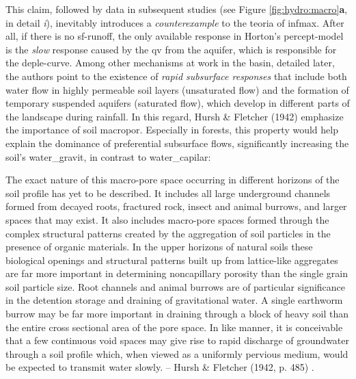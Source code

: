 \documentclass[./main_en.tex]{subfiles}
\begin{document}
\noindent This claim, followed by data in subsequent studies (see Figure \ref{fig:hydro:macro}\textbf{a}, in detail \textit{i}), inevitably introduces a \textit{counterexample} to the \gls{teoria} of \gls{infmax}. After all, if there is no \gls{sf-runoff}, the only available response in Horton’s \gls{percept-model} is the \textit{slow} response caused by the \gls{qv} from the aquifer, which is responsible for the \gls{deple-curve}. Among other mechanisms at work in the basin, detailed later, the authors point to the existence of \textit{rapid subsurface responses} that include both water flow in highly permeable soil layers (unsaturated flow) and the formation of temporary suspended aquifers (saturated flow), which develop in different parts of the landscape during rainfall. In this regard, Hursh \& Fletcher (1942) \cite{Hursh1942} emphasize the importance of soil \gls{macropor}. Especially in forests, this property would help explain the dominance of preferential subsurface flows, significantly increasing the soil’s \gls{water_gravit}, in contrast to \gls{water_capilar}:

\begin{adjustwidth}{100pt}{0pt}
\medskip
\small The exact nature of this macro-pore space occurring in different horizons of the soil profile has yet to be described. It includes all large underground channels formed from decayed roots, fractured rock, insect and animal burrows, and larger spaces that may exist. It also includes macro-pore spaces formed through the complex structural patterns created by the aggregation of soil particles in the presence of organic materials. In the upper horizons of natural soils these biological openings and structural patterns built up from lattice-like aggregates are far more important in determining noncapillary porosity than the single grain soil particle size. Root channels and animal burrows are of particular significance in the detention storage and draining of gravitational water. A single earthworm burrow may be far more important in draining through a block of heavy soil than the entire cross sectional area of the pore space. In like manner, it is conceivable that a few continuous void spaces may give rise to rapid discharge of groundwater through a soil profile which, when viewed as a uniformly pervious medium, would be expected to transmit water slowly. -- Hursh \& Fletcher (1942, p. 485) \cite{Hursh1942}.
\medskip
\end{adjustwidth}
\end{document}

